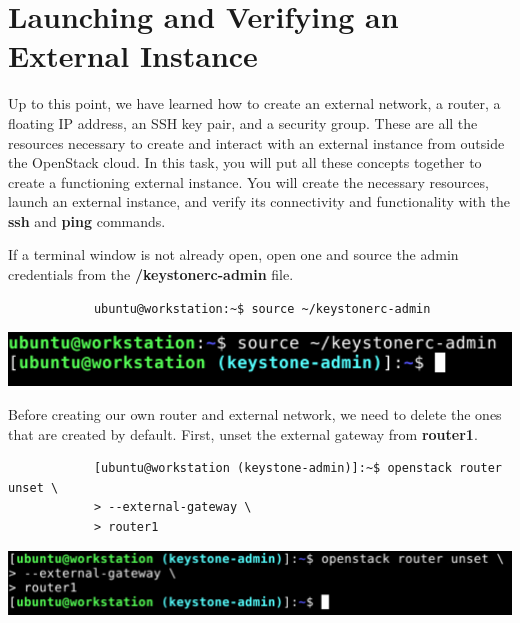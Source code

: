 \documentclass[letterpaper, 12pt]{article}
\begin{document}
\section{Launching and Verifying an External Instance}\label{sec:launching-an-external-instance}
Up to this point, we have learned how to create an external network, a router, a floating IP address, an SSH key pair, and a security group.
These are all the resources necessary to create and interact with an external instance from outside the OpenStack cloud.
In this task, you will put all these concepts together to create a functioning external instance.
You will create the necessary resources, launch an external instance, and verify its connectivity and functionality with the \textbf{ssh} and \textbf{ping} commands.

\begin{enumerate}
    \begin{labstep}
        If a terminal window is not already open, open one and source the admin credentials from the \textbf{\texttildemid/keystonerc-admin} file.
        \begin{lstlisting}
            ubuntu@workstation:~$ source ~/keystonerc-admin
        \end{lstlisting}

        \begin{center}
            \includegraphics[width=\linewidth]{images/part9/step1.png}
        \end{center}
    \end{labstep}

    \begin{labstep}
        Before creating our own router and external network, we need to delete the ones that are created by default.
        First, unset the external gateway from \textbf{router1}.
        \begin{lstlisting}
            [ubuntu@workstation (keystone-admin)]:~$ openstack router unset \
            > --external-gateway \
            > router1
        \end{lstlisting}

        \begin{center}
            \includegraphics[width=\linewidth]{images/part9/step2.png}
        \end{center}
    \end{labstep}


\end{enumerate}
\end{document}

